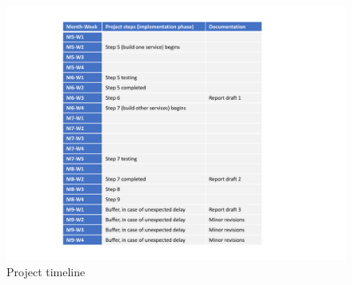 \documentclass[journal,onecolumn]{IEEEtran} %
\begin{document}
\begin{figure}[hbt!]
  \centering
  \includegraphics[scale=0.8]{figures/timeline.pdf}
  \caption{Project timeline}
  \label{fig:timeline}
\end{figure}

\pagebreak


\end{document}
